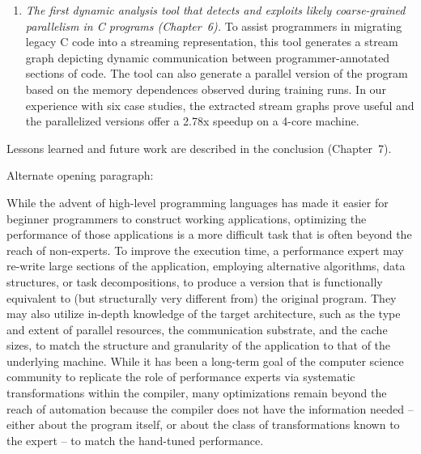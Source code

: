 \begin{enumerate}
\item {\it The first dynamic analysis tool that detects and exploits
  likely coarse-grained parallelism in C programs (Chapter~6).}  To
  assist programmers in migrating legacy C code into a streaming
  representation, this tool generates a stream graph depicting dynamic
  communication between programmer-annotated sections of code.  The
  tool can also generate a parallel version of the program based on
  the memory dependences observed during training runs.  In our
  experience with six case studies, the extracted stream graphs prove
  useful and the parallelized versions offer a 2.78x speedup on a
  4-core machine.

\end{enumerate}


\noindent Lessons learned and future work are described in the
conclusion (Chapter~7).

\newpage

Alternate opening paragraph:
\medskip

While the advent of high-level programming languages has made it
easier for beginner programmers to construct working applications,
optimizing the performance of those applications is a more difficult
task that is often beyond the reach of non-experts.  To improve the
execution time, a performance expert may re-write large sections of
the application, employing alternative algorithms, data structures, or
task decompositions, to produce a version that is functionally
equivalent to (but structurally very different from) the original
program.  They may also utilize in-depth knowledge of the target
architecture, such as the type and extent of parallel resources, the
communication substrate, and the cache sizes, to match the structure
and granularity of the application to that of the underlying machine.
While it has been a long-term goal of the computer science community
to replicate the role of performance experts via systematic
transformations within the compiler, many optimizations remain beyond
the reach of automation because the compiler does not have the
information needed -- either about the program itself, or about the
class of transformations known to the expert -- to match the
hand-tuned performance.
